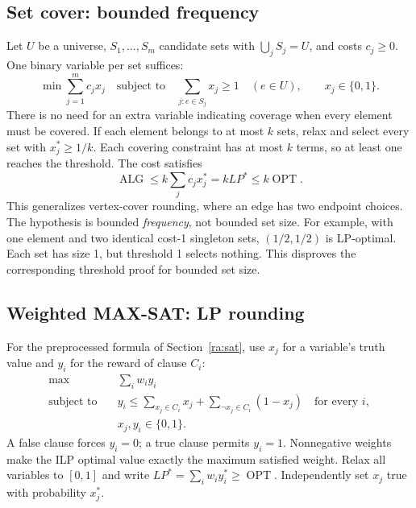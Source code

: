 \documentclass[10pt]{article}
\theoremstyle{definition}
\newcommand{\OPT}{\operatorname{OPT}}
\newcommand{\ALG}{\operatorname{ALG}}
\begin{document}
\subsection{Set cover: bounded frequency}\label{lp:cover}
Let $U$ be a universe, $S_1,\ldots,S_m$ candidate sets with
$\bigcup_jS_j=U$, and costs $c_j\ge0$. One binary variable per set suffices:
\[
  \min\sum_{j=1}^m c_jx_j
  \quad\text{subject to}\quad
  \sum_{j:e\in S_j}x_j\ge1\quad(e\in U),\qquad x_j\in\{0,1\}.
\]
There is no need for an extra variable indicating coverage when every
element must be covered. If each element belongs to at most $k$ sets,
relax and select every set with $x_j^*\ge1/k$. Each covering constraint has
at most $k$ terms, so at least one reaches the threshold. The cost satisfies
\[
  \ALG\le k\sum_jc_jx_j^*=kLP^*\le k\OPT.
\]
This generalizes vertex-cover rounding, where an edge has two endpoint
choices. The hypothesis is bounded \emph{frequency}, not bounded set size.
For example, with one element and two identical cost-1 singleton sets,
$(1/2,1/2)$ is LP-optimal. Each set has size 1, but threshold 1 selects
nothing. This disproves the corresponding threshold proof for bounded set
size.

\subsection{Weighted MAX-SAT: LP rounding}\label{lp:sat}
For the preprocessed formula of Section~\ref{ra:sat}, use $x_j$ for a
variable's truth value and $y_i$ for the reward of clause $C_i$:
\[
  \begin{aligned}
    \max\quad &\sum_iw_i y_i\\
    \text{subject to}\quad &
      y_i\le\sum_{x_j\in C_i}x_j+
             \sum_{\neg x_j\in C_i}(1-x_j)\quad\text{for every }i,\\
    &x_j,y_i\in\{0,1\}.
  \end{aligned}
\]
A false clause forces $y_i=0$; a true clause permits $y_i=1$.
Nonnegative weights make the ILP optimal value exactly the maximum
satisfied weight. Relax all variables to $[0,1]$ and write
$LP^*=\sum_iw_i y_i^*\ge\OPT$.
Independently set $x_j$ true with probability $x_j^*$.
\end{document}
